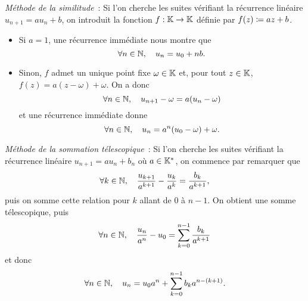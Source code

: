 \documentclass{magnoliaold}
\begin{document}
\vspace{2ex}
\begin{remarques}
\remarque \emph{Méthode de la similitude}~: Si l'on cherche les suites vérifiant la
  récurrence linéaire $u_{n+1}=a u_n+b$, on introduit la fonction $f:\mathbb{K}\to\mathbb{K}$ définie
  par $f(z)\coloneqq az+b$.
  \begin{itemize}
  \item Si $a=1$, une récurrence immédiate nous montre que
    \[\forall n\in\mathbb{N},\quad u_n=u_0 + nb.\]
  \item Sinon, $f$ admet un unique point fixe $\omega\in\mathbb{K}$ et, pour tout $z\in\mathbb{K}$, $f(z)=a(z-\omega)+\omega$.
    On a donc
    \[\forall n\in\mathbb{N},\quad u_{n+1}-\omega=a(u_n-\omega)\]
    et une récurrence immédiate donne
    \[\forall n\in\mathbb{N},\quad u_n = a^n(u_0-\omega) +\omega.\]
  \end{itemize}
\remarque \emph{Méthode de la sommation télescopique}~: Si l'on cherche les suites
  vérifiant la récurrence linéaire $u_{n+1}= a u_n + b_n$ où $a\in\mathbb{K}^*$, on commence par remarquer que
\[\forall k\in\mathbb{N},\quad \frac{u_{k+1}}{a^{k+1}} - \frac{u_k}{a^k}=\frac{b_k}{a^{k+1}},\]
puis on somme cette relation pour $k$ allant de 0 à $n-1$. On obtient une somme télescopique, puis
\[\forall n\in\mathbb{N},\quad \frac{u_n}{a^n}-u_0=\sum_{k=0}^{n-1} \frac{b_k}{a^{k+1}}\]
et donc
\[\forall n\in\mathbb{N},\quad u_n=u_0 a^n + \sum_{k=0}^{n-1} b_k a^{n-(k+1)}.\]
\end{remarques}
\end{document}
